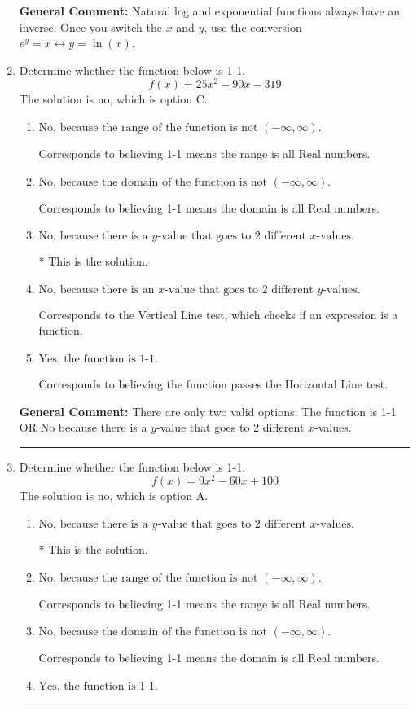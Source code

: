 \documentclass{extbook}[14pt]
\newcommand{\litem}[1]{\item #1

\rule{\textwidth}{0.4pt}}
\begin{document}
\begin{enumerate}
{\textbf{General Comment:} Natural log and exponential functions always have an inverse. Once you switch the $x$ and $y$, use the conversion $ e^y = x \leftrightarrow y=\ln(x)$.
}
\litem{
Determine whether the function below is 1-1.
\[ f(x) = 25 x^2 - 90 x - 319 \]The solution is \( \text{no} \), which is option C.\begin{enumerate}[label=\Alph*.]
\item \( \text{No, because the range of the function is not $(-\infty, \infty)$.} \)

Corresponds to believing 1-1 means the range is all Real numbers.
\item \( \text{No, because the domain of the function is not $(-\infty, \infty)$.} \)

Corresponds to believing 1-1 means the domain is all Real numbers.
\item \( \text{No, because there is a $y$-value that goes to 2 different $x$-values.} \)

* This is the solution.
\item \( \text{No, because there is an $x$-value that goes to 2 different $y$-values.} \)

Corresponds to the Vertical Line test, which checks if an expression is a function.
\item \( \text{Yes, the function is 1-1.} \)

Corresponds to believing the function passes the Horizontal Line test.
\end{enumerate}

\textbf{General Comment:} There are only two valid options: The function is 1-1 OR No because there is a $y$-value that goes to 2 different $x$-values.
}
\litem{
Determine whether the function below is 1-1.
\[ f(x) = 9 x^2 - 60 x + 100 \]The solution is \( \text{no} \), which is option A.\begin{enumerate}[label=\Alph*.]
\item \( \text{No, because there is a $y$-value that goes to 2 different $x$-values.} \)

* This is the solution.
\item \( \text{No, because the range of the function is not $(-\infty, \infty)$.} \)

Corresponds to believing 1-1 means the range is all Real numbers.
\item \( \text{No, because the domain of the function is not $(-\infty, \infty)$.} \)

Corresponds to believing 1-1 means the domain is all Real numbers.
\item \( \text{Yes, the function is 1-1.} \)


\end{enumerate}}
\end{enumerate}
\end{document}
